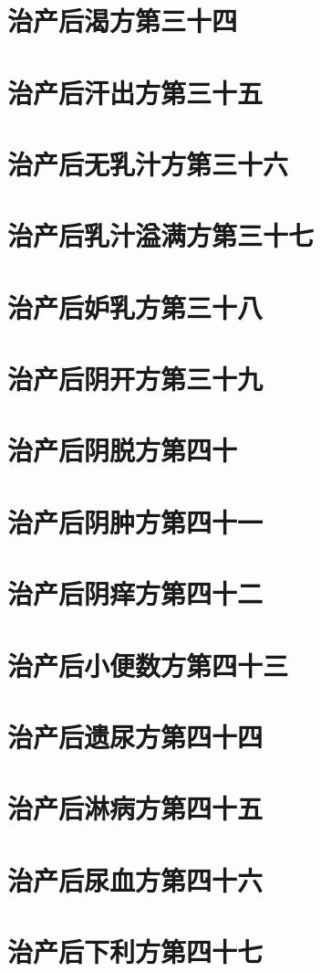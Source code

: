 \documentclass[a4paper,12pt,UTF8,twoside]{ctexbook}
\begin{document}
\chapter{治产后渴方第三十四}
\chapter{治产后汗出方第三十五}
\chapter{治产后无乳汁方第三十六}
\chapter{治产后乳汁溢满方第三十七}
\chapter{治产后妒乳方第三十八}
\chapter{治产后阴开方第三十九}
\chapter{治产后阴脱方第四十}
\chapter{治产后阴肿方第四十一}
\chapter{治产后阴痒方第四十二}
\chapter{治产后小便数方第四十三}
\chapter{治产后遗尿方第四十四}
\chapter{治产后淋病方第四十五}
\chapter{治产后尿血方第四十六}
\chapter{治产后下利方第四十七}
\end{document}
